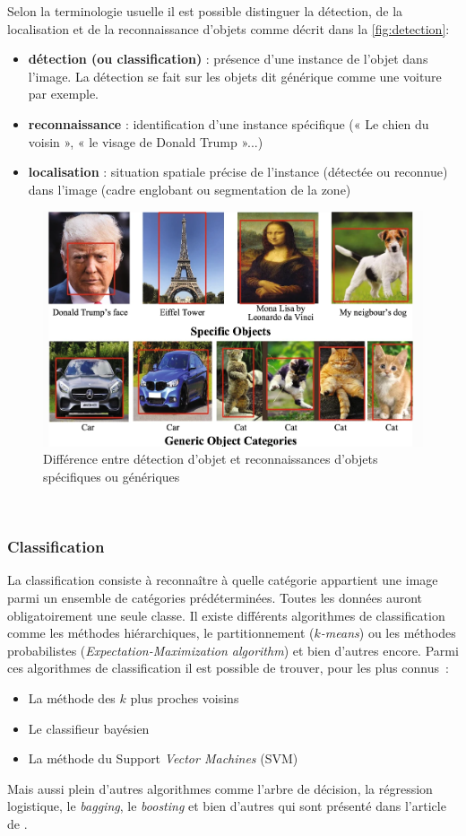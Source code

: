     Selon la terminologie usuelle il est possible distinguer la détection, de la localisation et de la reconnaissance d'objets \cite{liu_deep_2019} comme décrit dans la \autoref{fig:detection}:
\begin{itemize}
    \item \textbf{détection (ou classification)} : présence d'une instance de l'objet dans l'image. La détection se fait sur les objets dit générique comme une voiture par exemple. 
    \item\textbf{ reconnaissance} : identification d'une instance spécifique (« Le chien du voisin », « le visage de Donald Trump »...) 
    \item \textbf{localisation} : situation spatiale précise de l'instance (détectée ou reconnue) dans l'image (cadre englobant ou segmentation de la zone) \\
\end{itemize}  

\begin{figure}[ht!]
    \centering
    \includegraphics[width=0.6\linewidth]{Rapport/images/Object_detection.png}
    \caption{Différence entre détection d'objet et reconnaissances d'objets spécifiques ou génériques}
    \label{fig:detection}
\end{figure}   \\


\subsubsection{Classification}

La classification consiste à reconnaître à quelle catégorie appartient une image parmi un ensemble de catégories prédéterminées. Toutes les données auront obligatoirement une seule classe. Il existe différents algorithmes de classification comme les méthodes hiérarchiques, le partitionnement (\textit{$k$-means}) ou les méthodes probabilistes (\textit{Expectation-Maximization algorithm}) et bien d'autres encore. 
Parmi ces algorithmes de classification il est possible de trouver, pour les plus connus : 
\begin{itemize}
    \item La méthode des $k$ plus proches voisins
    \item Le classifieur bayésien
    \item La méthode du Support \textit{Vector Machines} (SVM)
\end{itemize}
Mais aussi plein d'autres algorithmes comme l'arbre de décision, la régression logistique, le \textit{bagging}, le \textit{boosting} et bien d'autres qui sont présenté dans l'article de \cite{talon_analyse_2018}.    

